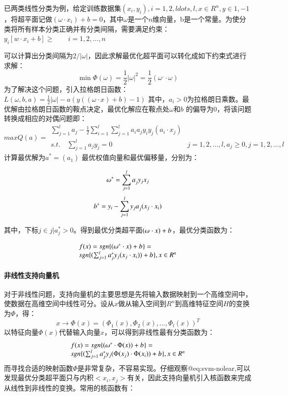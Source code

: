 \documentclass[bachelor,zhspacing]{cqu}  %
\begin{document}
已两类线性分类为例，给定训练数据集\((x_{i},y_{i}),i=1,2,ldots,l,x\in R^{n},y\in{1,-1}\)，将超平面记做\((\omega\cdot x_{i})+b=0\)，其中\(\omega\)是一个\(n\)维向量，b是一个常量。为使分类将所有样本分类正确并有分类间隔，需要满足约束：\(y_{i}[w\cdot x_{i}+b]\ge\quad\quad i = 1,2,\ldots,n\)

可以计算出分类间隔为\(2/\lvert \omega \rvert\)，因此求解最优化超平面可以转化成如下约束式进行求解：
\[\min\Phi(\omega) = \frac{1}{2}\lvert \omega \rvert^{2} = \frac{1}{2}(\omega^{,}\cdot\omega)\]
为了解决这个问题，引入拉格朗日函数：
\(L(\omega,b,a)=\frac{1}{2}\lvert\omega\rvert-a(y((\omega\cdot x) + b)-1)\)
其中，\(a_{i}>0\)为拉格朗日乘数。最优解由拉格朗日函数的鞍点决定，最优化解应在鞍点处\(\omega\)和\(b\)
的偏导为0，将该问题转换成相应的对偶问题即： \[maxQ(a) = 
\begin{array}{lll}
\sum_{j=1}^{l}a_{j}-\frac{1}{2}\sum_{i=1}^{l}\sum_{j=1}^{l}a_{i}a_{j}y_{i}y_{j}(a_{i}\cdot x_{j}) & \\
s.t.\quad \sum_{j=1}^{l}a_{j}y_{j}=0 & j=1,2,\ldots,l,a_{j}\ge0,j=1,2,\ldots,l
\end{array}\] 计算最优解为\(a^{*}=(a_{1}^{})\)
最优权值向量和最优偏移量，分别为：

\[\omega^{*} = \sum_{j=1}^{l}a_{j}^{\*}y_{j}x_{j}\]
\[b^{*} = y_{i}-\sum_{j=1}^{l}y_{j}a_{j}^{\*}(x_{j}\cdot x_{i})\]

其中，下标\(j\in{j|a_{j}^{*}>0}\)。得到最优分类超平面\((\omega^{\*}\cdot x) + b^{\*}\)，最优分类函数为：

\[
\begin{array}{ll}
f(x)=sgn\{(\omega^{*}\cdot x)+b^{\*}\}=\\
sgn\{(\sum_{j=1}^{l}a_{j}^{*}y_{j}(x_{j}\cdot x_{i}))+b^{\*}\},x\in R^{n}
\end{array}
\]

\paragraph{非线性支持向量机}\label{ux975eux7ebfux6027ux652fux6301ux5411ux91cfux673a}

对于非线性问题，支持向量机的主要思想是先将输入数据映射到一个高维空间中，使数据在高维空间中线性可分。设从\(x\)做从输入空间到\(R^{n}\)到高维特征空间\(H\)的变换为\(\Phi\)，得：
\[x\to\Phi(x)=(\Phi_{1}(x),\Phi_{2}(x),\ldots,\Phi_{l}(x))^{T}\]
以特征向量\(\Phi(x)\)代替输入向量\(x\)，可以得到非线性最有分类函数为：
\begin{equation}
\begin{array}{ll}
f(x)=sgn\{(\omega^{*}\cdot \Phi(x))+b^{\*}\}=\\
sgn\{(\sum_{j=1}^{l}a_{j}^{*}y_{j}(\Phi(x_{j})\cdot \Phi(x_{i}))+b^{\*}\},x\in R^{n}
\end{array}
\label{eq:svm-nolear}\end{equation}
而寻找合适的映射函数\(\Phi\)是非常复杂，不容易实现。仔细观察@eq:svm-nolear,可以发现最优分类超平面只与内积\(<x_{i},x_{j}>\)有关，因此支持向量机引入核函数来完成从线性到非线性的变换。常用的核函数有：
\end{document}
